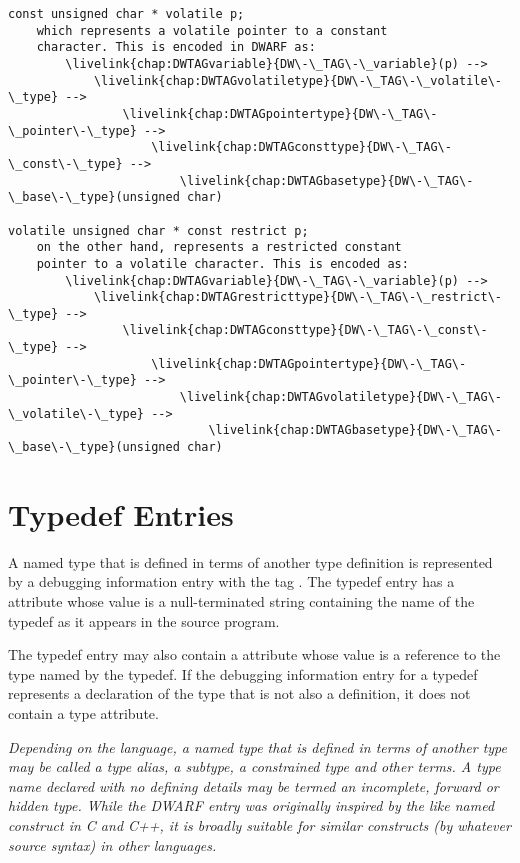 \begin{verbatim}
const unsigned char * volatile p;
    which represents a volatile pointer to a constant
    character. This is encoded in DWARF as:
        \livelink{chap:DWTAGvariable}{DW\-\_TAG\-\_variable}(p) -->
            \livelink{chap:DWTAGvolatiletype}{DW\-\_TAG\-\_volatile\-\_type} -->
                \livelink{chap:DWTAGpointertype}{DW\-\_TAG\-\_pointer\-\_type} -->
                    \livelink{chap:DWTAGconsttype}{DW\-\_TAG\-\_const\-\_type} -->
                        \livelink{chap:DWTAGbasetype}{DW\-\_TAG\-\_base\-\_type}(unsigned char)

volatile unsigned char * const restrict p;
    on the other hand, represents a restricted constant
    pointer to a volatile character. This is encoded as:
        \livelink{chap:DWTAGvariable}{DW\-\_TAG\-\_variable}(p) -->
            \livelink{chap:DWTAGrestricttype}{DW\-\_TAG\-\_restrict\-\_type} -->
                \livelink{chap:DWTAGconsttype}{DW\-\_TAG\-\_const\-\_type} -->
                    \livelink{chap:DWTAGpointertype}{DW\-\_TAG\-\_pointer\-\_type} -->
                        \livelink{chap:DWTAGvolatiletype}{DW\-\_TAG\-\_volatile\-\_type} -->
                            \livelink{chap:DWTAGbasetype}{DW\-\_TAG\-\_base\-\_type}(unsigned char)

\end{verbatim}

\section{Typedef Entries}
\label{chap:typedefentries}
A named type that is defined in terms of another type
definition is represented by a debugging information entry with
the tag . 
The typedef entry has a 
attribute whose value is a null-terminated string containing
the name of the typedef as it appears in the source program.

The typedef entry may also contain a  attribute whose
value is a reference to the type named by the typedef. If
the debugging information entry for a typedef represents
a declaration of the type that is not also a definition,
it does not contain a type attribute.

\textit{Depending on the language, a named type that is defined in
terms of another type may be called a type alias, a subtype,
a constrained type and other terms. A type name declared with
no defining details may be termed an incomplete, forward
or hidden type. While the DWARF  entry was
originally inspired by the like named construct in C and C++,
it is broadly suitable for similar constructs (by whatever
source syntax) in other languages.}


